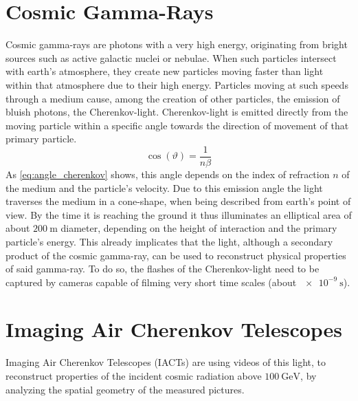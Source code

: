 \section{Cosmic Gamma-Rays}
%
Cosmic gamma-rays are photons with a very high energy, originating from bright
sources such as active galactic nuclei or nebulae. When such particles intersect
with earth's atmosphere, they create new particles moving faster than light
within that atmosphere due to their high energy. Particles moving at such
speeds through a medium cause, among the creation of other particles, the
emission of bluish photons, the Cherenkov-light.
Cherenkov-light is emitted directly from the moving particle
within a specific angle towards the direction of movement of that primary
particle.
%
\begin{equation}
    \cos(\vartheta) = \frac{1}{n\beta}
    \label{eq:angle_cherenkov}
\end{equation}
%
As \autoref{eq:angle_cherenkov} shows, this angle depends on the index of
refraction $n$ of the medium and the particle's velocity. Due to this emission
angle the light traverses the medium in a cone-shape, when being described from
earth's point of view. By the time it is reaching the ground it thus
illuminates an elliptical area of about $\SI{200}{\meter}$ diameter, depending
on the height of interaction and the primary particle's energy.
This already implicates that the light, although a secondary product of the
cosmic gamma-ray, can be used to reconstruct physical properties of
said gamma-ray. To do so, the flashes of the Cherenkov-light need to
be captured by cameras capable of filming very short time scales (about
$\SI{e-9}{\second}$).

\section{Imaging Air Cherenkov Telescopes}

Imaging Air Cherenkov Telescopes (IACTs) are using videos of this light, to
reconstruct properties of the incident cosmic radiation above
$\SI{100}{\giga\electronvolt}$, by analyzing the spatial geometry of the
measured pictures.


